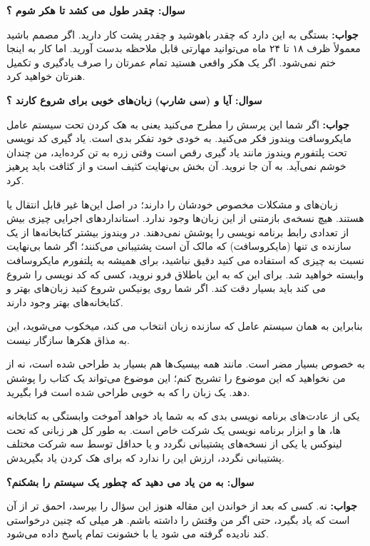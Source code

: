 \textbf{سوال:  چقدر طول می کشد تا هکر شوم ؟}

\textbf{جواب:} 
بستگی به این دارد که چقدر باهوشید و چقدر پشت کار دارید. اگر مصمم باشید معمولأ ظرف ۱۸ تا ۲۴ ماه می‌توانید مهارتی قابل ملاحظه بدست آورید. اما کار به اینجا ختم نمی‌شود. اگر یک هکر واقعی هستید تمام عمرتان را صرف یادگیری و تکمیل هنرتان خواهید کرد.

\textbf{سوال:  آیا 
 و 
(سی شارپ) زبان‌های خوبی برای شروع کارند ؟}

\textbf{جواب:} 
اگر شما این پرسش را مطرح می‌کنید یعنی به هک کردن تحت سیستم عامل مایکروسافت ویندوز فکر می‌کنید. به خودی خود تفکر بدی است. یاد گیری کد نویسی تحت پلتفورم ویندوز مانند یاد گیری رقص است وقتی زره به تن کرده‌اید، من چندان خوشم نمی‌آید. به آن جا نروید. آن بخش بی‌نهایت کثیف است و از کثافت باید پرهیز کرد.

زبان‌های 
 و
مشکلات مخصوص خودشان را دارند؛ در اصل این‌ها غیر قابل انتقال یا 
هستند. هیچ نسخه‌ی بازمتنی از این زبان‌ها وجود ندارد. استاندارد‌های اجرایی 
چیزی بیش از تعدادی رابط برنامه نویسی را پوشش نمی‌دهند. در ویندوز بیشتر کتابخانه‌ها از یک سازنده ی تنها (مایکروسافت) که مالک آن است پشتیبانی می‌کنند؛ اگر شما بی‌نهایت نسبت به چیزی که استفاده می کنید دقیق نباشید، برای همیشه به پلتفورم مایکروسافت وابسته خواهید شد. برای این که به این باطلاق فرو نروید، کسی که کد نویسی را شروع می کند باید بسیار دقت کند. اگر شما روی یونیکس شروع کنید زبان‌های بهتر و کتابخانه‌های بهتر وجود دارند.

بنابراین به همان سیستم عامل که سازنده زبان انتخاب می کند، میخکوب می‌شوید، این به مذاق هکرها سازگار نیست.

به خصوص 
 بسیار مضر است. مانند همه بیسیک‌ها 
هم بسیار بد طراحی شده است، نه از من نخواهید که این موضوع را تشریح کنم؛ این موضوع می‌تواند یک کتاب را پوشش دهد. یک زبان را که به خوبی طراحی شده است فرا بگیرید.

یکی از عادت‌های برنامه نویسی بدی که به شما یاد خواهد آموخت وابستگی به کتابخانه ها، 
 ها و ابزار برنامه نویسی یک شرکت خاص است. به طور کل هر زبانی که تحت لینوکس یا یکی از نسخه‌های 
 پشتیبانی نگردد و یا حداقل توسط سه شرکت مختلف پشتیبانی نگردد، ارزش این را ندارد که برای هک کردن یاد بگیریدش.
 
\textbf{سوال:  به من یاد می دهید که چطور یک سیستم را بشکنم؟}

\textbf{جواب:}
نه. کسی که بعد از خواندن این مقاله هنوز این سؤال را بپرسد، احمق تر از آن است که یاد بگیرد، حتی اگر من وقتش را داشته باشم. هر میلی که چنین درخواستی کند نادیده گرفته می شود یا با خشونت تمام پاسخ داده می‌شود.
 

